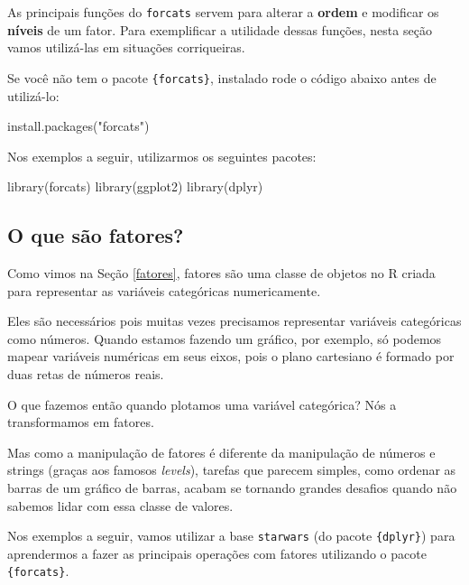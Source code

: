 \documentclass[
]{book}
\newenvironment{Shaded}{\begin{snugshade}}{\end{snugshade}}
\newcommand{\FunctionTok}[1]{\textcolor[rgb]{0.00,0.00,0.00}{#1}}
\newcommand{\NormalTok}[1]{#1}
\newcommand{\StringTok}[1]{\textcolor[rgb]{0.31,0.60,0.02}{#1}}
\begin{document}
As principais funções do \texttt{forcats} servem para alterar a \textbf{ordem} e modificar os \textbf{níveis} de um fator. Para exemplificar a utilidade dessas funções, nesta seção vamos utilizá-las em situações corriqueiras.

Se você não tem o pacote \texttt{\{forcats\}}, instalado rode o código abaixo antes de utilizá-lo:

\begin{Shaded}
\begin{Highlighting}[]
\FunctionTok{install.packages}\NormalTok{(}\StringTok{"forcats"}\NormalTok{)}
\end{Highlighting}
\end{Shaded}

Nos exemplos a seguir, utilizarmos os seguintes pacotes:

\begin{Shaded}
\begin{Highlighting}[]
\FunctionTok{library}\NormalTok{(forcats)}
\FunctionTok{library}\NormalTok{(ggplot2)}
\FunctionTok{library}\NormalTok{(dplyr)}
\end{Highlighting}
\end{Shaded}

\hypertarget{o-que-suxe3o-fatores}{%
\subsection{O que são fatores?}\label{o-que-suxe3o-fatores}}

Como vimos na Seção \ref{fatores}, fatores são uma classe de objetos no R criada para representar as variáveis categóricas numericamente.

Eles são necessários pois muitas vezes precisamos representar variáveis categóricas como números. Quando estamos fazendo um gráfico, por exemplo, só podemos mapear variáveis numéricas em seus eixos, pois o plano cartesiano é formado por duas retas de números reais.

O que fazemos então quando plotamos uma variável categórica? Nós a transformamos em fatores.

Mas como a manipulação de fatores é diferente da manipulação de números e strings (graças aos famosos \emph{levels}), tarefas que parecem simples, como ordenar as barras de um gráfico de barras, acabam se tornando grandes desafios quando não sabemos lidar com essa classe de valores.

Nos exemplos a seguir, vamos utilizar a base \texttt{starwars} (do pacote \texttt{\{dplyr\}}) para aprendermos a fazer as principais operações com fatores utilizando o pacote \texttt{\{forcats\}}.
\end{document}
